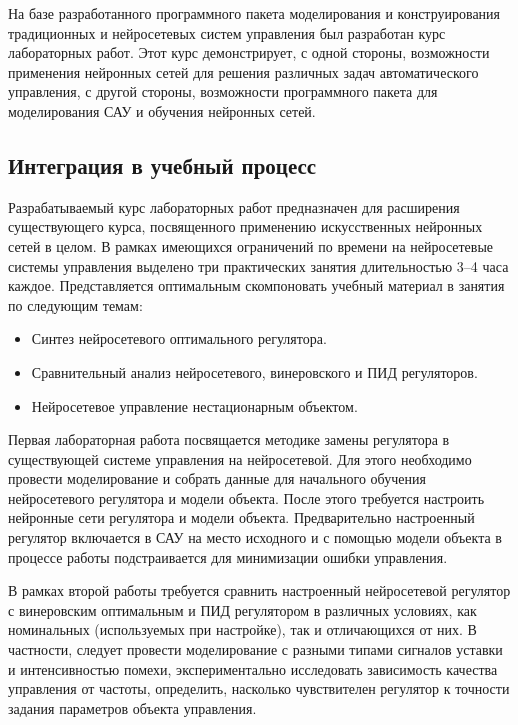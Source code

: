 
На базе разработанного программного пакета моделирования и
конструирования традиционных и нейросетевых систем управления был
разработан курс лабораторных работ.  Этот курс демонстрирует, с одной
стороны, возможности применения нейронных сетей для решения различных
задач автоматического управления, с другой стороны, возможности
программного пакета для моделирования САУ и обучения нейронных сетей.

\subsection{Интеграция в учебный процесс}

Разрабатываемый курс лабораторных работ предназначен для расширения
существующего курса, посвященного применению искусственных нейронных
сетей в целом.  В рамках имеющихся ограничений по времени на
нейросетевые системы управления выделено три практических занятия
длительностью 3--4 часа каждое.  Представляется оптимальным
скомпоновать учебный материал в занятия по следующим темам:

\begin{itemize}
\item Синтез нейросетевого оптимального регулятора.
\item Сравнительный анализ нейросетевого, винеровского и ПИД регуляторов.
\item Нейросетевое управление нестационарным объектом.
\end{itemize}

Первая лабораторная работа посвящается методике замены регулятора в
существующей системе управления на нейросетевой.  Для этого необходимо
провести моделирование и собрать данные для начального обучения
нейросетевого регулятора и модели объекта.  После этого требуется
настроить нейронные сети регулятора и модели объекта.  Предварительно
настроенный регулятор включается в САУ на место исходного и с помощью
модели объекта в процессе работы подстраивается для минимизации ошибки
управления.

В рамках второй работы требуется сравнить настроенный нейросетевой
регулятор с винеровским оптимальным и ПИД регулятором в различных
условиях, как номинальных (используемых при настройке), так и
отличающихся от них.  В частности, следует провести моделирование с
разными типами сигналов уставки и интенсивностью помехи,
экспериментально исследовать зависимость качества управления от
частоты, определить, насколько чувствителен регулятор к точности
задания параметров объекта управления.

